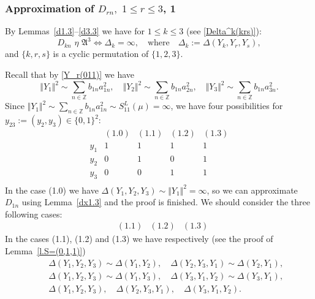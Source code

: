 \documentclass[preprint,12pt]{elsarticle}
\numberwithin{equation}{section}
\begin{document}
\subsubsection{Approximation of $D_{rn},\,\,1\leq r\leq 3$, 1}
\label{s.444}
By Lemmas~\ref{d1.3}--\ref{d3.3} we have for $1\leq k\leq 3$ (see \eqref{Delta^k(krs)}):
%
\begin{equation*}
D_{kn}\,\,\eta\,\,{\mathfrak A}^3\Leftrightarrow \Delta_k=\infty,\quad\text{where}\quad 
\Delta_k:=\Delta(Y_k,Y_r,Y_s),
\end{equation*}
and $\{k,r,s\}$ is a cyclic permutation of $\{1,2,3\}$.

Recall that by \eqref{Y_r(011)} we have 
\begin{equation}
\label{Y(r)=}
\Vert Y_1 \Vert^2\sim
\sum_{n\in \mathbb Z}b_{1n}a_{1n}^2,\quad
\Vert Y_2 \Vert^2\sim
\sum_{n\in \mathbb Z}b_{1n}a_{2n}^2,\quad
\Vert Y_3\Vert^2\sim
\sum_{n\in \mathbb Z}b_{1n}a_{3n}^2. 
\end{equation}
Since $\Vert Y_1\Vert^2\sim\sum_{n\in \mathbb Z}
b_{1n}a^2_{1n}\sim S^L_{11}(\mu)
=\infty$, we have  four 
possibilities for $y_{23}:=(y_2,y_3)\in \{0,1\}^2$:
\begin{equation}
 \label{(y_1,y_2,y_3)(011)}
\begin{array}{ccccc}
   &(1.0)&(1.1)&(1.2)&(1.3)\\
y_1&1&1&1&1\\
y_2&0&1&0&1\\
y_3&0&0&1&1\\
\end{array}
\end{equation}
In the case (1.0) we have $\Delta(Y_1,Y_2,Y_3)\sim \Vert Y_1\Vert^2=\infty$, so we can approximate $D_{1n}$ using Lemma~\ref{dx1.3} and the proof is finished.
We should consider the three following cases:
$$
\begin{array}{cccc}
   &(1.1)&(1.2)&(1.3)
\end{array}
$$
In the cases (1.1), (1.2) and (1.3) we have respectively (see the proof of Lemma~\ref{l.S=(0,1,1)})
%
\begin{eqnarray}
\label{(1.1)}
&& 
\Delta(Y_1,Y_2,Y_3)\sim \Delta(Y_1,Y_2),\quad
\Delta(Y_2,Y_3,Y_1)\sim  \Delta(Y_2,Y_1),\\
\label{(1.2)}
&& 
\Delta(Y_1,Y_2,Y_3)\sim \Delta(Y_1,Y_3),\quad 
\Delta(Y_3,Y_1,Y_2)\sim  \Delta(Y_3,Y_1),\\
\label{(1.3)}
&& 
\Delta(Y_1,Y_2,Y_3),\quad \Delta(Y_2,Y_3,Y_1),\quad
\Delta(Y_3,Y_1,Y_2).
\end{eqnarray}
\end{document}
